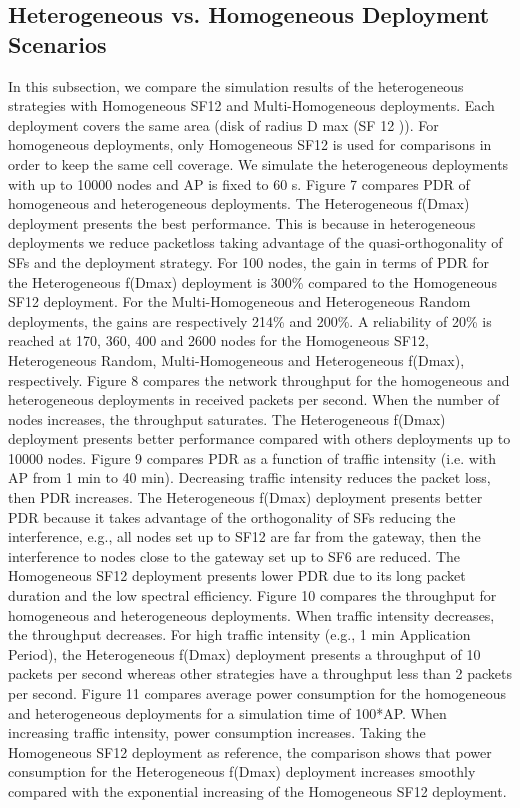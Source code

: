 \subsection{Heterogeneous vs. Homogeneous Deployment Scenarios}
In this subsection,
	we compare the simulation results of the heterogeneous strategies with Homogeneous SF12 and Multi-Homogeneous deployments.
Each deployment covers the same area (disk of radius D max (SF 12 )).
For homogeneous deployments,
	only Homogeneous SF12 is used for comparisons in order to keep the same cell coverage.
We simulate the heterogeneous deployments with up to 10000 nodes and AP is fixed to 60 s.
Figure 7 compares PDR of homogeneous and heterogeneous deployments.
The Heterogeneous f(Dmax) deployment presents the best performance.
This is because in heterogeneous deployments we reduce packetloss taking advantage of the quasi-orthogonality of SFs and the deployment strategy.
For 100 nodes,
	the gain in terms of PDR for the Heterogeneous f(Dmax) deployment is 300\% compared to the Homogeneous SF12
deployment.
For the Multi-Homogeneous and Heterogeneous Random deployments,
	the gains are respectively 214\% and 200\%.
A reliability of 20\% is reached at
170, 360, 400 and 2600 nodes for the Homogeneous SF12,
	Heterogeneous Random,
	Multi-Homogeneous and Heterogeneous f(Dmax),
	respectively.
Figure 8 compares the network throughput for the homogeneous and heterogeneous deployments in received packets per second.
When the number of nodes increases,
	the throughput saturates.
The Heterogeneous f(Dmax) deployment presents better performance compared with others deployments up to 10000 nodes.
Figure 9 compares PDR as a function of traffic intensity (i.e.
with AP from 1 min to 40 min).
Decreasing traffic intensity reduces the packet loss,
	then PDR increases.
The Heterogeneous f(Dmax) deployment presents better PDR because it takes advantage of the orthogonality of SFs reducing the interference,
	e.g.,
	all nodes set up to SF12 are far from the gateway,
	then the interference to nodes close to the gateway set up to SF6 are reduced.
The Homogeneous SF12 deployment presents lower PDR due to its long packet duration and the low spectral efficiency.
Figure 10 compares the throughput for homogeneous and heterogeneous deployments.
When traffic intensity decreases,
	the throughput decreases.
For high traffic intensity (e.g., 1 min Application Period),
	the Heterogeneous f(Dmax) deployment presents a throughput of 10 packets per second whereas other strategies have a throughput less than 2 packets per second.
Figure 11 compares average power consumption for the homogeneous and heterogeneous deployments for a simulation time of 100*AP.
When increasing traffic intensity,
	power consumption increases.
Taking the Homogeneous SF12 deployment as reference,
	the comparison shows that power consumption for the Heterogeneous f(Dmax) deployment increases smoothly compared with the exponential increasing of the Homogeneous SF12 deployment.

